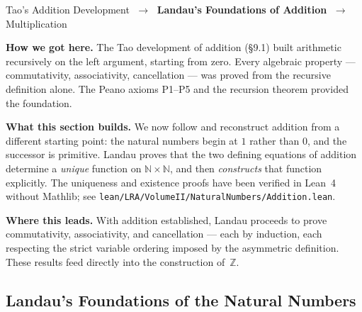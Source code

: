 %
%

\begin{tcolorbox}[colback=gray!6, colframe=gray!40, arc=2pt,
  left=8pt, right=8pt, top=6pt, bottom=6pt,
  title={\small\textbf{Where You Are in the Journey}},
  fonttitle=\small\bfseries]
\begin{center}\small
  Tao's Addition Development $\;\to\;$ \textbf{Landau's Foundations of Addition}
  $\;\to\;$ Multiplication
\end{center}
\medskip
\noindent\textbf{How we got here.}
The Tao development of addition (§9.1) built arithmetic recursively on the
left argument, starting from zero. Every algebraic property --- commutativity,
associativity, cancellation --- was proved from the recursive definition alone.
The Peano axioms P1--P5 and the recursion theorem provided the foundation.

\medskip
\noindent\textbf{What this section builds.}
We now follow \cite{LandauFoundationsAnalysis} and reconstruct addition
from a different starting point: the natural numbers begin at $1$ rather than
$0$, and the successor is primitive. Landau proves that the two defining
equations of addition determine a \emph{unique} function on
$\mathbb{N} \times \mathbb{N}$, and then \emph{constructs} that function
explicitly. The uniqueness and existence proofs have been verified in
Lean~4 without Mathlib; see
\texttt{lean/LRA/VolumeII/NaturalNumbers/Addition.lean}.

\medskip
\noindent\textbf{Where this leads.}
With addition established, Landau proceeds to prove commutativity,
associativity, and cancellation --- each by induction, each respecting the
strict variable ordering imposed by the asymmetric definition. These results
feed directly into the construction of~$\mathbb{Z}$.
\end{tcolorbox}
\vspace{1em}

\subsection*{Landau's Foundations of the Natural Numbers}

